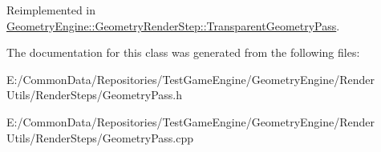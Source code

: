 Reimplemented in \mbox{\hyperlink{class_geometry_engine_1_1_geometry_render_step_1_1_transparent_geometry_pass_a05b2c129cdefb4d5b4d140b683f63f99}{Geometry\+Engine\+::\+Geometry\+Render\+Step\+::\+Transparent\+Geometry\+Pass}}.



The documentation for this class was generated from the following files\+:\begin{DoxyCompactItemize}
\item 
E\+:/\+Common\+Data/\+Repositories/\+Test\+Game\+Engine/\+Geometry\+Engine/\+Render Utils/\+Render\+Steps/Geometry\+Pass.\+h\item 
E\+:/\+Common\+Data/\+Repositories/\+Test\+Game\+Engine/\+Geometry\+Engine/\+Render Utils/\+Render\+Steps/Geometry\+Pass.\+cpp\end{DoxyCompactItemize}
